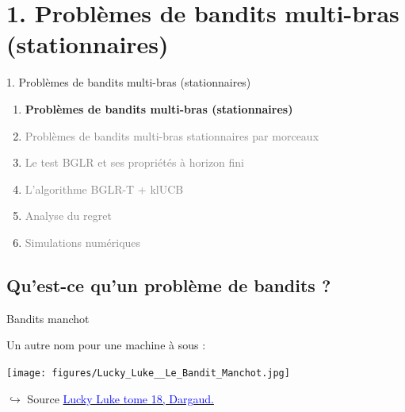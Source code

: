 \documentclass[11pt,french,ignorenonframetext,]{beamer}
\begin{document}
\section{\hfill{}1. Problèmes de bandits multi-bras (stationnaires)\hfill{}}

\begin{frame}{1. Problèmes de bandits multi-bras (stationnaires)}

  \begin{enumerate}
    \item
    \alert{\textbf{%
      Problèmes de bandits multi-bras (stationnaires)
    }}
    \vspace*{15pt}

    \item
    \textcolor{gray}{
      Problèmes de bandits multi-bras stationnaires par morceaux
    }
    \vspace*{15pt}

    \item
    \textcolor{gray}{
      Le test BGLR et ses propriétés à horizon fini
    }
    \vspace*{15pt}

    \item
    \textcolor{gray}{
      L'algorithme BGLR-T + klUCB
    }
    \vspace*{15pt}

    \item
    \textcolor{gray}{
      Analyse du regret
    }
    \vspace*{15pt}

    \item
    \textcolor{gray}{
      Simulations numériques
    }
  \end{enumerate}

\end{frame}

\subsection{\hfill{}Qu'est-ce qu'un problème de bandits ?\hfill{}}


\begin{frame}{Bandits manchot}

  Un autre nom pour une machine à sous :

  \begin{center}
    \texttt{[image: figures/Lucky\_Luke\_\_Le\_Bandit\_Manchot.jpg]}
  \end{center}

  \begin{tiny}
  $\hookrightarrow$ Source
    \href{https://www.dargaud.com/bd/LUCKY-LUKE/Lucky-Luke/Lucky-Luke-tome-18-Bandit-manchot-Le}{\textcolor{blue}{Lucky Luke tome 18, \textcopyright{} Dargaud.}}
  \end{tiny}

\end{frame}
\end{document}
